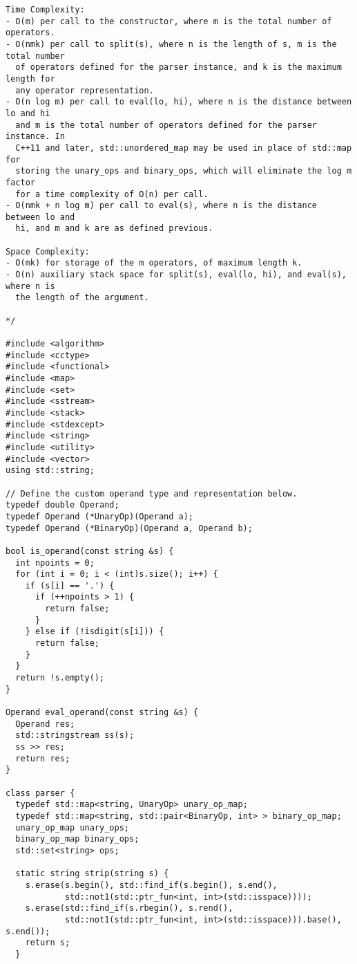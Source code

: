 \begin{lstlisting}
Time Complexity:
- O(m) per call to the constructor, where m is the total number of operators.
- O(nmk) per call to split(s), where n is the length of s, m is the total number
  of operators defined for the parser instance, and k is the maximum length for
  any operator representation.
- O(n log m) per call to eval(lo, hi), where n is the distance between lo and hi
  and m is the total number of operators defined for the parser instance. In
  C++11 and later, std::unordered_map may be used in place of std::map for
  storing the unary_ops and binary_ops, which will eliminate the log m factor
  for a time complexity of O(n) per call.
- O(nmk + n log m) per call to eval(s), where n is the distance between lo and
  hi, and m and k are as defined previous.

Space Complexity:
- O(mk) for storage of the m operators, of maximum length k.
- O(n) auxiliary stack space for split(s), eval(lo, hi), and eval(s), where n is
  the length of the argument.

*/

#include <algorithm>
#include <cctype>
#include <functional>
#include <map>
#include <set>
#include <sstream>
#include <stack>
#include <stdexcept>
#include <string>
#include <utility>
#include <vector>
using std::string;

// Define the custom operand type and representation below.
typedef double Operand;
typedef Operand (*UnaryOp)(Operand a);
typedef Operand (*BinaryOp)(Operand a, Operand b);

bool is_operand(const string &s) {
  int npoints = 0;
  for (int i = 0; i < (int)s.size(); i++) {
    if (s[i] == '.') {
      if (++npoints > 1) {
        return false;
      }
    } else if (!isdigit(s[i])) {
      return false;
    }
  }
  return !s.empty();
}

Operand eval_operand(const string &s) {
  Operand res;
  std::stringstream ss(s);
  ss >> res;
  return res;
}

class parser {
  typedef std::map<string, UnaryOp> unary_op_map;
  typedef std::map<string, std::pair<BinaryOp, int> > binary_op_map;
  unary_op_map unary_ops;
  binary_op_map binary_ops;
  std::set<string> ops;

  static string strip(string s) {
    s.erase(s.begin(), std::find_if(s.begin(), s.end(),
            std::not1(std::ptr_fun<int, int>(std::isspace))));
    s.erase(std::find_if(s.rbegin(), s.rend(),
            std::not1(std::ptr_fun<int, int>(std::isspace))).base(), s.end());
    return s;
  }


\end{lstlisting}

